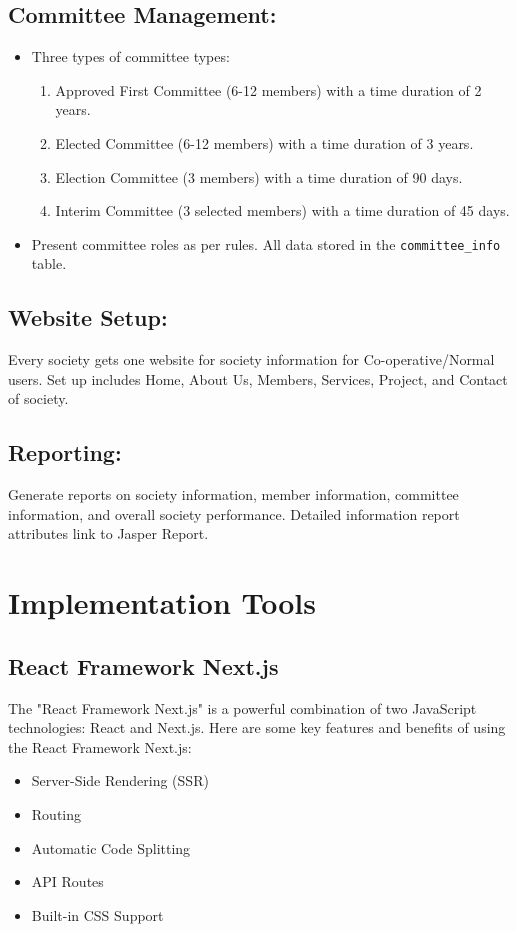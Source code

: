 \subsection{Committee Management:}
\begin{itemize}
    \item Three types of committee types: 
    \begin{enumerate}
        \item Approved First Committee (6-12 members) with a time duration of 2 years.
        \item Elected Committee (6-12 members) with a time duration of 3 years.
        \item Election Committee (3 members) with a time duration of 90 days.
        \item Interim Committee (3 selected members) with a time duration of 45 days.
    \end{enumerate}
    \item Present committee roles as per rules. All data stored in the \texttt{committee\_info} table.
\end{itemize}

\subsection{Website Setup:}
Every society gets one website for society information for Co-operative/Normal users. Set up includes Home, About Us, Members, Services, Project, and Contact of society.

\subsection{Reporting:}
Generate reports on society information, member information, committee information, and overall society performance. Detailed information report attributes link to Jasper Report.


\section{Implementation Tools}
\subsection{React Framework Next.js}
The "React Framework Next.js" is a powerful combination of two JavaScript technologies: React and Next.js. Here are some key features and benefits of using the React Framework Next.js:
\begin{itemize}
    \item Server-Side Rendering (SSR)
    \item Routing
    \item Automatic Code Splitting
    \item API Routes
    \item Built-in CSS Support
\end{itemize}

